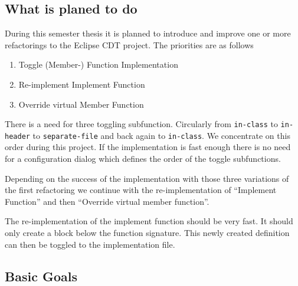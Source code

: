 \documentclass[a4paper,10pt]{scrreprt}
\begin{document}
\subsection*{What is planed to do}

During this semester thesis it is planned to introduce and improve one or more
refactorings to the Eclipse CDT project. The priorities are as follows

\begin{enumerate}
\item Toggle (Member-) Function Implementation
\item Re-implement Implement Function
\item Override virtual Member Function
\end{enumerate}

There is a need for three toggling subfunction.  Circularly from \texttt{in-class}
to \texttt{in-header} to \texttt{separate-file}  and back again to
\texttt{in-class}. We concentrate on this order during this project. If the
implementation is fast enough there is no need for a configuration dialog which
defines the order of the toggle subfunctions.\newline

Depending on the success of the implementation with those three variations of the
first refactoring we continue with the re-implementation of  ``Implement
Function'' and then ``Override virtual member function''.\newline

The re-implementation of the implement function should be very fast. It should
only create a block below the function signature. This newly created definition
can then be toggled to the implementation file.

\subsection*{Basic Goals}
\end{document}

